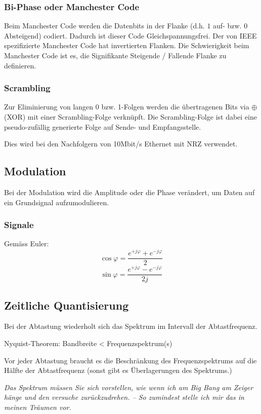 \begin{multicols}{2}
\subsubsection{Bi-Phase oder Manchester Code}
	Beim Manchester Code werden die Datenbits in der Flanke (d.h. $1$ auf- bzw. $0$ Absteigend) codiert. Dadurch ist dieser Code Gleichspannungsfrei.
	Der von IEEE spezifizierte Manchester Code hat invertierten Flanken.
	Die Schwierigkeit beim Manchester Code ist es, die Signifikante Steigende / Fallende Flanke zu definieren.

	
\subsubsection{Scrambling}
	Zur Eliminierung von langen 0 bzw. 1-Folgen werden die übertragenen Bits via $\oplus$ (XOR) mit einer Scrambling-Folge verknüpft.
	Die Scrambling-Folge ist dabei eine pseudo-zufällig generierte Folge auf Sende- und Empfangsstelle.
	
	Dies wird bei den Nachfolgern von 10Mbit/s Ethernet mit NRZ verwendet.

\subsection{Modulation}
	
	Bei der Modulation wird die Amplitude oder die Phase verändert, um Daten auf ein Grundsignal aufzumodulieren.
	

\subsubsection{Signale}
	
	
	Gemäss Euler:
	\[
		\cos \varphi = \frac{
			e^{+j \varphi} + e^{-j \varphi}
		}{2}
	\]
	\[
		\sin \varphi = \frac{
			e^{+j \varphi} - e^{-j \varphi}
		}{2j}
	\]
	


\subsection{Zeitliche Quantisierung}

	Bei der Abtastung wiederholt sich das Spektrum im Intervall der Abtastfrequenz.
	
	Nyquist-Theorem: Bandbreite < Frequenzspektrum(s)
	
	Vor jeder Abtastung braucht es die Beschränkung des Frequenzspektrums auf die Hälfte der Abtastfrequenz (sonst gibt es Überlagerungen des Spektrums.)

	

\end{multicols}

	\emph{Das Spektrum müssen Sie sich vorstellen, wie wenn ich am Big Bang am Zeiger hänge und den versuche zurückzudrehen. \--- So zumindest stelle ich mir das in meinen Träumen vor.}



